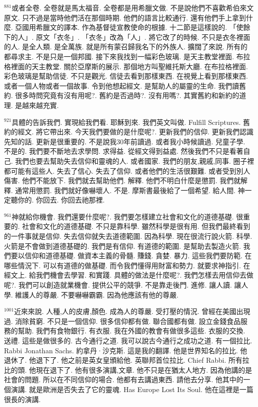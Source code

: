 \documentclass{book}
\begin{document}
$^{881}$或者全卷.
全卷就是馬太福音.
全卷都是用希臘文做.
不是說他們不喜歡希伯來文原文.
只不過是當時他們活在那個時期.
他們的語言比較通行.
還有他們手上拿到什麼.
亞國用希臘文的譯本.
作為基督徒宣教使命的根據.
十二節是這樣說的.
「使餘下的人」.
原文「衣冬」.
「衣冬」改為「人」.
將它改了的時候.
不只是衣冬裡面的人.
是全人類.
是全萬族.
就是所有蒙召歸我名下的外族人.
擴闊了來說.
所有的都尋求主.
不是只是一個邦國.
接下來我找到一幅彩色玻璃.
是天主教堂裡面.
布拉格裡面的天主教堂.
關於亞摩斯的展示.
那個地方叫聖維托斯大廳.
在布拉格裡面.
彩色玻璃是幫助信徒.
不只是觀光.
信徒去看到那樣東西.
在視覺上看到那樣東西.
或者一個人物或者一個故事.
令到他想起經文.
是幫助人的屬靈的生命.
我們讀舊約.
很多時問究竟有沒有用呢?.
舊約是否過時?.
沒有用嗎?.
其實舊約和新約的道理.
是越來越充實.

$^{921}$具體的告訴我們.
實現給我們看.
耶穌到來.
我們英文叫做.
Fulfill Scriptures.
舊約的經文.
將它帶出來.
今天我們要做的是什麼呢?.
更新我們的信仰.
更新我們認識先知的話.
更新是很重要的.
不是說我30年前讀過.
或者我小時候讀過.
兒童子學.
不是的.
我們要不斷地去求學問.
求得益.
從經文得到益處.
然後我們不只是看著自己.
我們也要去幫助失去信仰和靈魂的人.
或者國家.
我們的朋友,親戚,同事.
圈子裡都可能有這些人.
失去了信心.
失去了信仰.
或者他們的生活很艱難.
或者受到別人傷害.
他們不能放下.
我們就去幫助他們.
解釋.
他們不明白什麼是懲罰.
我們就解釋.
通常用懲罰.
我們就好像嚇壞人.
不是.
摩斯書最後給了一個希望.
給人間.
神一定聽你的.
你回去.
你回去祂那裡.

$^{961}$神就給你機會.
我們還要什麼呢?.
我們要怎樣建立社會和文化的道德基礎.
很重要的.
社會和文化的道德基礎.
不只是靠科學.
雖然科學是很有用.
但我們最終看到的一件事就是信仰.
失去信仰就失去道德範圍.
因為科學.
現在很流行說火箭.
科學.
火箭是不會做到道德基礎的.
我們是有信仰.
有道德的範圍.
是幫助去製造火箭.
我們要以信仰和道德基礎.
做資本主義的骨髓.
賺錢.
貪婪.
暴力.
這些我們要防範.
在哪些情況下.
可以有道德的做基礎.
而令我們懂得用財富和勢力.
就要求神指引.
在經文上.
給我們機會去學習.
和實踐.
具體的做法是什麼呢?.
我們怎樣去用信仰去做呢?.
我們可以創造就業機會.
提供公平的競爭.
不是靠走後門.
進修.
讓人讀.
讓人學.
維護人的尊嚴.
不要嚇嚇霸霸.
因為他應該有他的尊嚴.

$^{1001}$近來來說.
人種,人的皮膚,顏色.
成為人的尊嚴.
受打壓的情況.
曾經在美國出現過.
消除貧窮.
不只是一個信仰.
很多信仰都有做.
聯合國都有做.
設立金錢食品服務的幫助.
我們有食物銀行.
有衣服.
我在外國的教會有做很多這些.
衣服的交換.
送禮.
這些是做很多的.
古今通行之道.
我可以說古今通行之成功之道.
有一個拉比.
Rabbi Jonathan Sachs.
約拿丹·沙克斯.
這是我的翻譯.
他是世界知名的拉比.
他退休了.
他退下了.
他之前是英女皇頒給他.
英聯邦首位拉比.
Chief Rabbi.
所有拉比的頭.
他現在退下了.
他有很多演講,文章.
他不只是在猶太人地方.
因為他講的是社會的問題.
所以在不同信仰的場合.
他都有去講過東西.
請他去分享.
他其中的一個演講.
就是歐洲是否失去了它的靈魂.
Has Europe Lost Its Soul.
他在這裡是一篇很長的演講.
\end{document}
